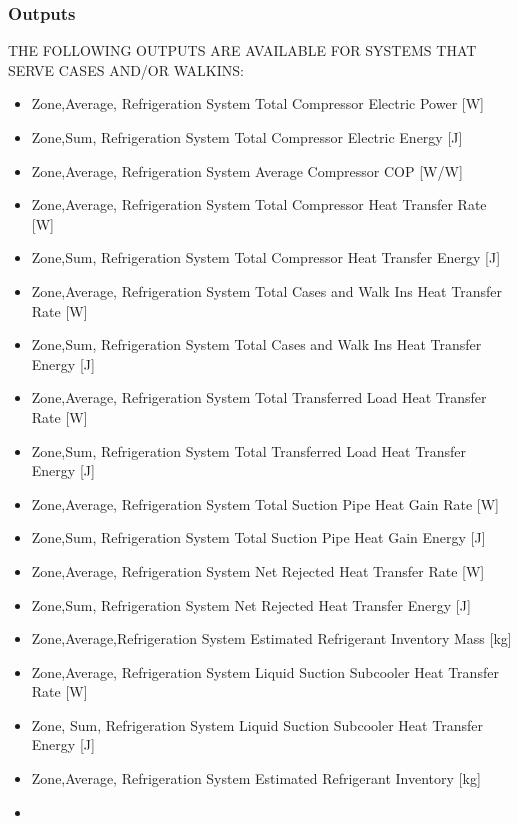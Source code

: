 \subsubsection{Outputs}\label{outputs-2-018}

THE FOLLOWING OUTPUTS ARE AVAILABLE FOR SYSTEMS THAT SERVE CASES AND/OR WALKINS:

\begin{itemize}
\item
  Zone,Average, Refrigeration System Total Compressor Electric Power {[}W{]}
\item
  Zone,Sum, Refrigeration System Total Compressor Electric Energy {[}J{]}
\item
  Zone,Average, Refrigeration System Average Compressor COP {[}W/W{]}
\item
  Zone,Average, Refrigeration System Total Compressor Heat Transfer Rate {[}W{]}
\item
  Zone,Sum, Refrigeration System Total Compressor Heat Transfer Energy {[}J{]}
\item
  Zone,Average, Refrigeration System Total Cases and Walk Ins Heat Transfer Rate {[}W{]}
\item
  Zone,Sum, Refrigeration System Total Cases and Walk Ins Heat Transfer Energy {[}J{]}
\item
  Zone,Average, Refrigeration System Total Transferred Load Heat Transfer Rate {[}W{]}
\item
  Zone,Sum, Refrigeration System Total Transferred Load Heat Transfer Energy {[}J{]}
\item
  Zone,Average, Refrigeration System Total Suction Pipe Heat Gain Rate {[}W{]}
\item
  Zone,Sum, Refrigeration System Total Suction Pipe Heat Gain Energy {[}J{]}
\item
  Zone,Average, Refrigeration System Net Rejected Heat Transfer Rate {[}W{]}
\item
  Zone,Sum, Refrigeration System Net Rejected Heat Transfer Energy {[}J{]}
\item
  Zone,Average,Refrigeration System Estimated Refrigerant Inventory Mass {[}kg{]}
\item
  Zone,Average, Refrigeration System Liquid Suction Subcooler Heat Transfer Rate {[}W{]}
\item
  Zone, Sum, Refrigeration System Liquid Suction Subcooler Heat Transfer Energy {[}J{]}
\item
  Zone,Average, Refrigeration System Estimated Refrigerant Inventory {[}kg{]}
\item

\end{itemize}
